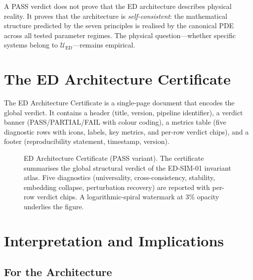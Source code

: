 \documentclass[11pt,twoside,openright]{book}
\theoremstyle{definition}
\theoremstyle{plain}
\theoremstyle{definition}
\theoremstyle{remark}
\newcommand{\UED}{\mathcal{U}_{\mathrm{ED}}}
\begin{document}
A PASS verdict does not prove that the ED architecture describes physical reality. It proves that the architecture is \emph{self-consistent}: the mathematical structure predicted by the seven principles is realised by the canonical PDE across all tested parameter regimes. The physical question---whether specific systems belong to \(\UED\)---remains empirical.


\chapter{The ED Architecture Certificate}\label{ch:certificate}

The ED Architecture Certificate is a single-page document that encodes the global verdict. It contains a header (title, version, pipeline identifier), a verdict banner (PASS/PARTIAL/FAIL with colour coding), a metrics table (five diagnostic rows with icons, labels, key metrics, and per-row verdict chips), and a footer (reproducibility statement, timestamp, version).

\begin{figure}[ht]
\centering
\caption{ED Architecture Certificate (PASS variant). The certificate summarises the global structural verdict of the ED-SIM-01 invariant atlas. Five diagnostics (universality, cross-consistency, stability, embedding collapse, perturbation recovery) are reported with per-row verdict chips. A logarithmic-spiral watermark at 3\% opacity underlies the figure.}
\label{fig:certificate}
\end{figure}


\chapter{Interpretation and Implications}\label{ch:implications}

\section{For the Architecture}
\end{document}
